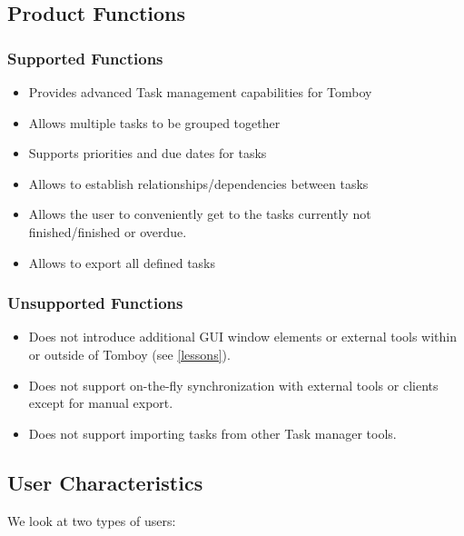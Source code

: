 \subsection{Product Functions}
\label{description:functions}

  \subsubsection*{Supported Functions}
  \label{description:functions:supported}

    \begin{itemize}
      \item Provides advanced Task management capabilities for Tomboy
      \item Allows multiple tasks to be grouped together
      \item Supports priorities and due dates for tasks
      \item Allows to establish relationships/dependencies between tasks
      \item Allows the user to conveniently get to the tasks currently not finished/finished or overdue.
      \item Allows to export all defined tasks
    \end{itemize}

    \subsubsection*{Unsupported Functions}
      \label{description:functions:unsupported}
      \begin{itemize}
        \item Does not introduce additional GUI window elements or external tools within or outside of Tomboy (see \ref{lessons}).
        \item Does not support on-the-fly synchronization with external tools or clients except for manual export.
        \item Does not support importing tasks from other Task manager tools.
      \end{itemize}

\subsection{User Characteristics}
\label{description:usercharacteristics}
We look at two types of users:

